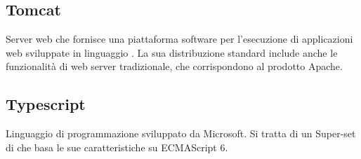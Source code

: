 \subsection*{Tomcat}
Server web che fornisce una piattaforma software per l'esecuzione di applicazioni web sviluppate in linguaggio . La sua distribuzione standard include anche le funzionalità di web server tradizionale, che corrispondono al prodotto Apache. 

\subsection*{Typescript}
Linguaggio di programmazione  sviluppato da Microsoft. Si tratta di un Super-set di  che basa le sue caratteristiche su ECMAScript 6.

